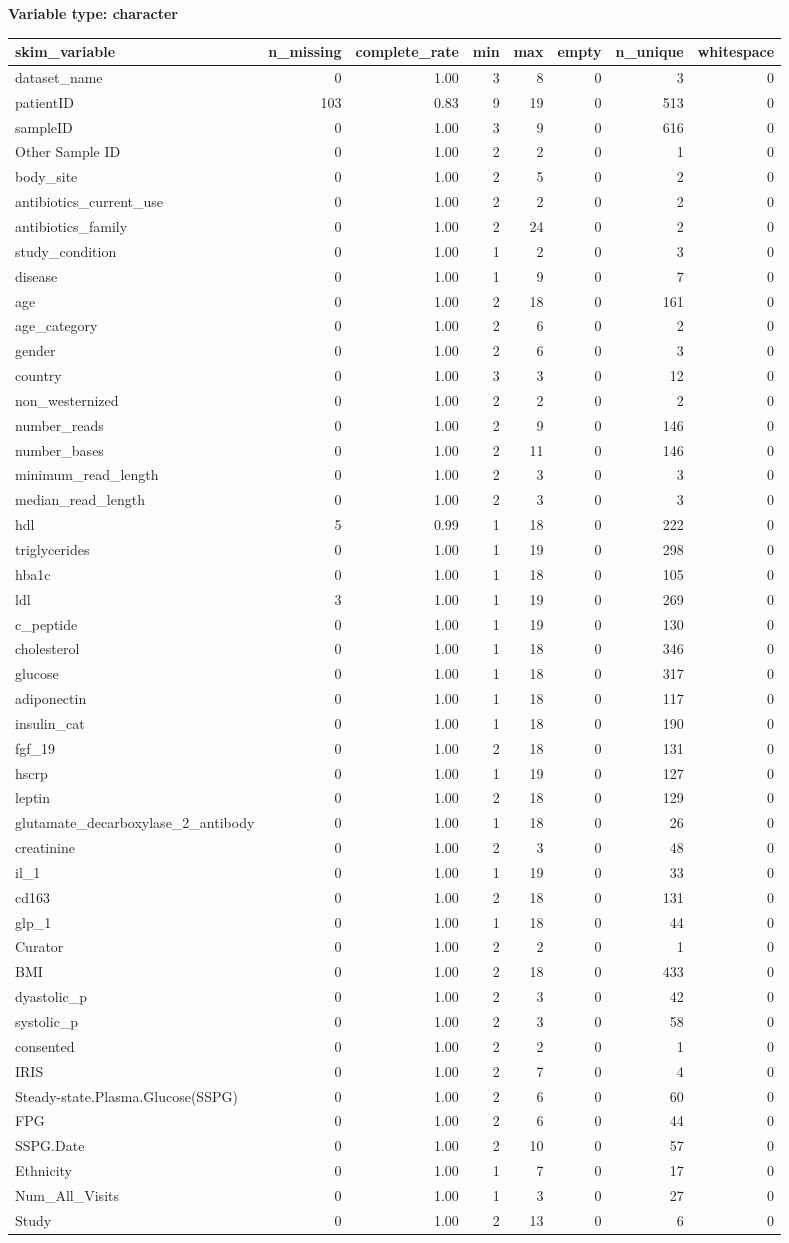 \documentclass[]{article}
\begin{document}
\textbf{Variable type: character}

\begin{longtable}[]{@{}lrrrrrrr@{}}
\toprule
skim\_variable & n\_missing & complete\_rate & min & max & empty &
n\_unique & whitespace\tabularnewline
\midrule
\endhead
dataset\_name & 0 & 1.00 & 3 & 8 & 0 & 3 & 0\tabularnewline
patientID & 103 & 0.83 & 9 & 19 & 0 & 513 & 0\tabularnewline
sampleID & 0 & 1.00 & 3 & 9 & 0 & 616 & 0\tabularnewline
Other Sample ID & 0 & 1.00 & 2 & 2 & 0 & 1 & 0\tabularnewline
body\_site & 0 & 1.00 & 2 & 5 & 0 & 2 & 0\tabularnewline
antibiotics\_current\_use & 0 & 1.00 & 2 & 2 & 0 & 2 & 0\tabularnewline
antibiotics\_family & 0 & 1.00 & 2 & 24 & 0 & 2 & 0\tabularnewline
study\_condition & 0 & 1.00 & 1 & 2 & 0 & 3 & 0\tabularnewline
disease & 0 & 1.00 & 1 & 9 & 0 & 7 & 0\tabularnewline
age & 0 & 1.00 & 2 & 18 & 0 & 161 & 0\tabularnewline
age\_category & 0 & 1.00 & 2 & 6 & 0 & 2 & 0\tabularnewline
gender & 0 & 1.00 & 2 & 6 & 0 & 3 & 0\tabularnewline
country & 0 & 1.00 & 3 & 3 & 0 & 12 & 0\tabularnewline
non\_westernized & 0 & 1.00 & 2 & 2 & 0 & 2 & 0\tabularnewline
number\_reads & 0 & 1.00 & 2 & 9 & 0 & 146 & 0\tabularnewline
number\_bases & 0 & 1.00 & 2 & 11 & 0 & 146 & 0\tabularnewline
minimum\_read\_length & 0 & 1.00 & 2 & 3 & 0 & 3 & 0\tabularnewline
median\_read\_length & 0 & 1.00 & 2 & 3 & 0 & 3 & 0\tabularnewline
hdl & 5 & 0.99 & 1 & 18 & 0 & 222 & 0\tabularnewline
triglycerides & 0 & 1.00 & 1 & 19 & 0 & 298 & 0\tabularnewline
hba1c & 0 & 1.00 & 1 & 18 & 0 & 105 & 0\tabularnewline
ldl & 3 & 1.00 & 1 & 19 & 0 & 269 & 0\tabularnewline
c\_peptide & 0 & 1.00 & 1 & 19 & 0 & 130 & 0\tabularnewline
cholesterol & 0 & 1.00 & 1 & 18 & 0 & 346 & 0\tabularnewline
glucose & 0 & 1.00 & 1 & 18 & 0 & 317 & 0\tabularnewline
adiponectin & 0 & 1.00 & 1 & 18 & 0 & 117 & 0\tabularnewline
insulin\_cat & 0 & 1.00 & 1 & 18 & 0 & 190 & 0\tabularnewline
fgf\_19 & 0 & 1.00 & 2 & 18 & 0 & 131 & 0\tabularnewline
hscrp & 0 & 1.00 & 1 & 19 & 0 & 127 & 0\tabularnewline
leptin & 0 & 1.00 & 2 & 18 & 0 & 129 & 0\tabularnewline
glutamate\_decarboxylase\_2\_antibody & 0 & 1.00 & 1 & 18 & 0 & 26 &
0\tabularnewline
creatinine & 0 & 1.00 & 2 & 3 & 0 & 48 & 0\tabularnewline
il\_1 & 0 & 1.00 & 1 & 19 & 0 & 33 & 0\tabularnewline
cd163 & 0 & 1.00 & 2 & 18 & 0 & 131 & 0\tabularnewline
glp\_1 & 0 & 1.00 & 1 & 18 & 0 & 44 & 0\tabularnewline
Curator & 0 & 1.00 & 2 & 2 & 0 & 1 & 0\tabularnewline
BMI & 0 & 1.00 & 2 & 18 & 0 & 433 & 0\tabularnewline
dyastolic\_p & 0 & 1.00 & 2 & 3 & 0 & 42 & 0\tabularnewline
systolic\_p & 0 & 1.00 & 2 & 3 & 0 & 58 & 0\tabularnewline
consented & 0 & 1.00 & 2 & 2 & 0 & 1 & 0\tabularnewline
IRIS & 0 & 1.00 & 2 & 7 & 0 & 4 & 0\tabularnewline
Steady-state.Plasma.Glucose(SSPG) & 0 & 1.00 & 2 & 6 & 0 & 60 &
0\tabularnewline
FPG & 0 & 1.00 & 2 & 6 & 0 & 44 & 0\tabularnewline
SSPG.Date & 0 & 1.00 & 2 & 10 & 0 & 57 & 0\tabularnewline
Ethnicity & 0 & 1.00 & 1 & 7 & 0 & 17 & 0\tabularnewline
Num\_All\_Visits & 0 & 1.00 & 1 & 3 & 0 & 27 & 0\tabularnewline
Study & 0 & 1.00 & 2 & 13 & 0 & 6 & 0\tabularnewline
\bottomrule
\end{longtable}
\end{document}
